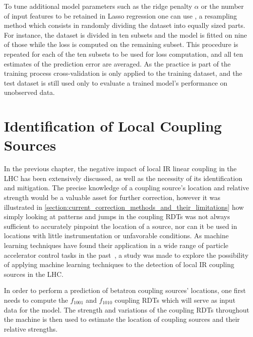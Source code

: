 To tune additional model parameters such as the ridge penalty \(\alpha\) or the number of input features to be retained in Lasso regression one can use , a resampling method which consists in randomly dividing the dataset into equally sized parts.
For instance, the dataset is divided in ten subsets and the model is fitted on nine of those while the loss is computed on the remaining subset.
This procedure is repeated for each of the ten subsets to be used for loss computation, and all ten estimates of the prediction error are averaged.
As the practice is part of the training process cross-validation is only applied to the training dataset, and the test dataset is still used only to evaluate a trained model's performance on unobserved data.

\section{Identification of Local Coupling Sources}

In the previous chapter, the negative impact of local IR linear coupling in the LHC has been extensively discussed, as well as the necessity of its identification and mitigation.
The precise knowledge of a coupling source's location and relative strength would be a valuable asset for further correction, however it was illustrated in \cref{section:current_correction_methods_and_their_limitations} how simply looking at patterns and jumps in the coupling RDTs was not always sufficient to accurately pinpoint the  location of a source, nor can it be used in locations with little instrumentation or unfavorable conditions.
As machine learning techniques have found their application in a wide range of particle accelerator control tasks in the past~\cite{IPAC:Fol:Machine_Learning_Methods_for_Optics_Measurements_and_Corrections_at_LHC, IEEE:Edelen:Neural_Networks_Modeling_Control_Particle_Accelerators, EPAC:Bozoki:Neural_Networks_Orbit_Control_Accelerators, IPAC:Meier:Orbit_Correction_Studies_using_Neural_Networks, EPAC:Kijima:Beam_Diagnostic_System_for_Accelerator_using_Neural_Networks, PRAB:Fol:Detection_Faulty_BPMs, EPJP:Fol:Supervised_Learning_Reconstruction_Magnet_Errors}, a study was made to explore the possibility of applying machine learning techniques to the detection of local IR coupling sources in the LHC.

In order to perform a prediction of betatron coupling sources' locations, one first needs to compute the \(f_{1001}\) and \(f_{1010}\) coupling RDTs which will serve as input data for the model.
The strength and variations of the coupling RDTs throughout the machine is then used to estimate the location of coupling sources and their relative strengths.

